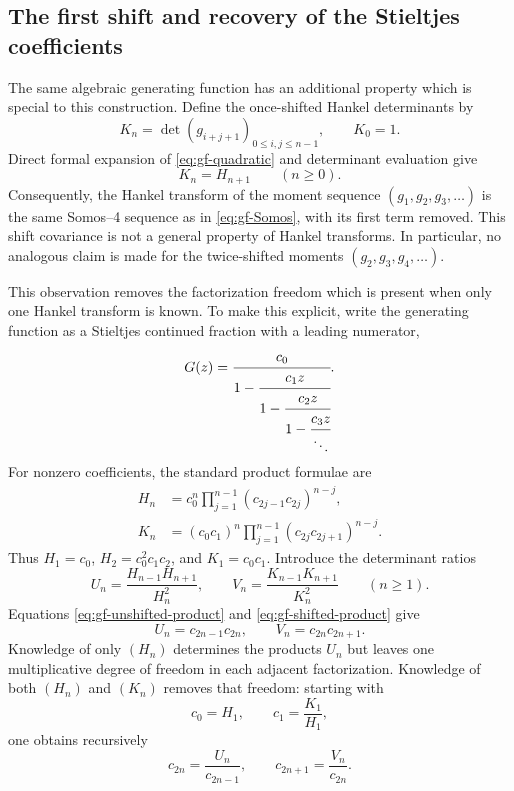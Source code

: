 \documentclass[11pt]{article}
\theoremstyle{remark}
\begin{document}
\subsection{The first shift and recovery of the Stieltjes coefficients}
The same algebraic generating function has an additional property which is
special to this construction.  Define the once-shifted Hankel determinants by
\begin{equation}
 K_n=\det(g_{i+j+1})_{0\leq i,j\leq n-1},\qquad K_0=1.
 \label{eq:gf-shifted-Hankel}
\end{equation}
Direct formal expansion of \eqref{eq:gf-quadratic} and determinant evaluation
give
\begin{equation}
 K_n=H_{n+1}\qquad(n\geq0).
 \label{eq:gf-shift-identity}
\end{equation}
Consequently, the Hankel transform of the moment sequence
$(g_1,g_2,g_3,\ldots)$ is the same Somos--4 sequence as in
\eqref{eq:gf-Somos}, with its first term removed.  This shift covariance is
not a general property of Hankel transforms.  In particular, no analogous
claim is made for the twice-shifted moments $(g_2,g_3,g_4,\ldots)$.

This observation removes the factorization freedom which is present when only
one Hankel transform is known.  To make this explicit, write the generating
function as a Stieltjes continued fraction with a leading numerator,
\begin{equation}
 G(z)=\cfrac{c_0}{1-\cfrac{c_1z}{1-\cfrac{c_2z}{1-\cfrac{c_3z}{\ddots}}}}.
 \label{eq:gf-S-fraction}
\end{equation}
For nonzero coefficients, the standard product formulae are
\begin{align}
 H_n&=c_0^n\prod_{j=1}^{n-1}(c_{2j-1}c_{2j})^{n-j},
 \label{eq:gf-unshifted-product}\\
 K_n&=(c_0c_1)^n\prod_{j=1}^{n-1}(c_{2j}c_{2j+1})^{n-j}.
 \label{eq:gf-shifted-product}
\end{align}
Thus $H_1=c_0$, $H_2=c_0^2c_1c_2$, and $K_1=c_0c_1$.
Introduce the determinant ratios
\begin{equation}
 U_n=\frac{H_{n-1}H_{n+1}}{H_n^2},\qquad
 V_n=\frac{K_{n-1}K_{n+1}}{K_n^2}\qquad(n\geq1).
 \label{eq:gf-two-ratio-families}
\end{equation}
Equations \eqref{eq:gf-unshifted-product} and
\eqref{eq:gf-shifted-product} give
\begin{equation}
 U_n=c_{2n-1}c_{2n},\qquad V_n=c_{2n}c_{2n+1}.
 \label{eq:gf-adjacent-products}
\end{equation}
Knowledge of only $(H_n)$ determines the products $U_n$ but leaves one
multiplicative degree of freedom in each adjacent factorization.  Knowledge of
both $(H_n)$ and $(K_n)$ removes that freedom: starting with
\begin{equation}
 c_0=H_1,\qquad c_1=\frac{K_1}{H_1},
 \label{eq:gf-c0-c1}
\end{equation}
one obtains recursively
\begin{equation}
 c_{2n}=\frac{U_n}{c_{2n-1}},\qquad
 c_{2n+1}=\frac{V_n}{c_{2n}}.
 \label{eq:gf-c-recovery}
\end{equation}
\end{document}
